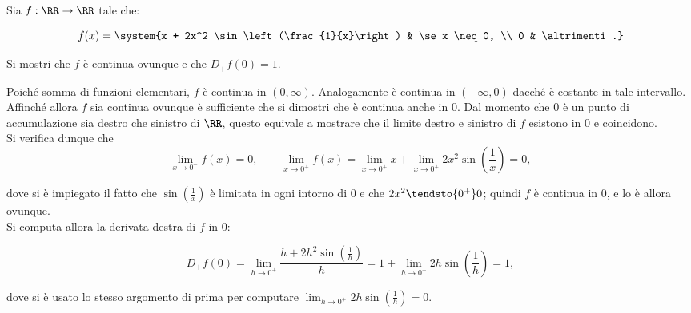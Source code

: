 \documentclass[11pt]{article}
\begin{document}
	\begin{exercise}
		Sia $f: \RR \to \RR$ tale che:
		
		\[ f(x) = \system{x + 2x^2 \sin\left(\frac{1}{x}\right) & \se x \neq 0, \\ 0 & \altrimenti.} \]
		
		\vskip 0.05in
		
		Si mostri che $f$ è continua ovunque e che $D_+ f(0) = 1$.
	\end{exercise}

	\begin{solution}
		Poiché somma di funzioni elementari, $f$ è continua in $(0, \infty)$. Analogamente è continua in
		$(-\infty, 0)$ dacché è costante in tale intervallo. Affinché allora $f$ sia continua ovunque è
		sufficiente che si dimostri che è continua anche in $0$. Dal momento che $0$ è un punto di accumulazione
		sia destro che sinistro di $\RR$, questo equivale a mostrare che il limite destro e sinistro di $f$
		esistono in $0$ e coincidono. \\
		
		Si verifica dunque che
		\[ \lim_{x \to 0^-} f(x) = 0, \qquad \lim_{x \to 0^+} f(x) = \lim_{x \to 0^+} x + \lim_{x \to 0^+} 2x^2 \sin\left(\frac{1}{x}\right) = 0, \]
		
		dove si è impiegato il fatto che $\sin\left(\frac{1}{x}\right)$ è limitata in ogni intorno di $0$ e che
		$2x^2 \tendsto{0^+} 0$; quindi $f$ è continua in $0$, e lo è allora ovunque. \\
		
		Si computa allora la derivata destra di $f$ in $0$:
		
		\[ D_+ f(0) =  \lim_{h \to 0^+} \frac{h + 2h^2 \sin\left(\frac{1}{h}\right)}{h} = 1 + \lim_{h \to 0^+} 2 h \sin\left(\frac{1}{h}\right) = 1,   \]
		
		dove si è usato lo stesso argomento di prima per computare $\lim_{h \to 0^+} 2 h \sin\left(\frac{1}{h}\right) = 0$. \\
	\end{solution}
\end{document}
